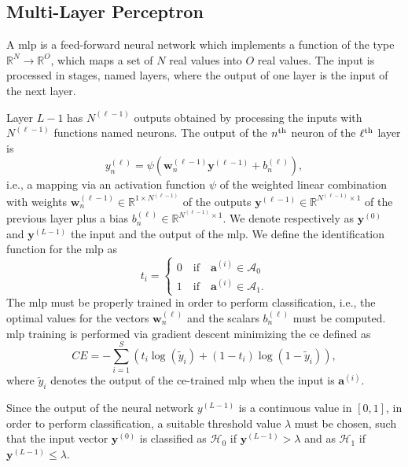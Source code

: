 \documentclass[twocolumns]{IEEEtran}
\begin{document}
\subsection{Multi-Layer Perceptron}\label{sec:nn}

A \ac{mlp} is a feed-forward neural network which implements a function of the type $\mathbb{R}^N \to \mathbb{R}^O$, which maps a set of $N$ real values into $O$ real values. The input is processed in stages, named layers, where the output of one layer is the input of the next layer.

Layer $L-1$ has $N^{(\ell-1)}$ outputs obtained by processing the inputs with $N^{(\ell-1)}$ functions named neurons. The output of the $n^{\rm th}$ neuron of the $\ell^{\rm th}$ layer is
\begin{equation}\label{eq:nonLin}
y_n^{(\ell)} = \psi\left( \bm{w}_n^{(\ell -1)}\bm{y}^{(\ell-1)}+b_n^{(\ell)} \right),
\end{equation}
i.e., a mapping via an activation function $\psi$ of the weighted linear combination with weights $\bm{w}_n^{(\ell -1)}\in \mathbb{R}^{1\times N^{(\ell-1)}}$ of the outputs $\bm{y}^{(\ell-1)} \in \mathbb{R}^{N^{(\ell-1)} \times 1 }$ of the previous layer plus a bias $b_n^{(\ell)} \in \mathbb{R}^{N^{(\ell-1)} \times 1 }$. We denote respectively as $\bm{y}^{(0)}$ and $\bm{y}^{(L-1)}$ the input and the output of the \ac{mlp}. 
We define the identification function for the \ac{mlp} as
\begin{equation}
  t_i =
  \begin{cases}
  0 \quad \text{if} \quad \bm{a}^{(i)} \in \mathcal{A}_0\\
  1 \quad \text{if} \quad \bm{a}^{(i)} \in \mathcal{A}_1.
  \end{cases}
\end{equation}
The \ac{mlp} must be properly trained in order to perform classification, i.e., the optimal values for the vectors $\bm{w}_n^{(\ell)}$ and the scalars $b_n^{(\ell)}$ must be computed. \Ac{mlp} training is performed via gradient descent minimizing the \ac{ce} defined as
\begin{equation}\label{eq:ce}
CE = -\sum_{i=1}^{S}\left(t_i\log\left(\tilde{y}_i\right)+\left(1-t_i\right)\log\left(1-\tilde{y}_i\right) \right),
\end{equation}
where $\tilde{y}_i$ denotes the output of the \ac{ce}-trained \ac {mlp} when the input is $\bm{a}^{(i)}$.

Since the output of the neural network $y^{(L-1)}$ is a continuous value in $[0,1]$, in order to perform classification, a suitable threshold value $\lambda$ must be chosen, such that the input vector $\bm{y}^{(0)}$ is classified as
$\mathcal{H}_0$ if $\bm{y}^{(L-1)} > \lambda$ and as $\mathcal{H}_1$ if $\bm{y}^{(L-1)} \le \lambda$.
\end{document}
